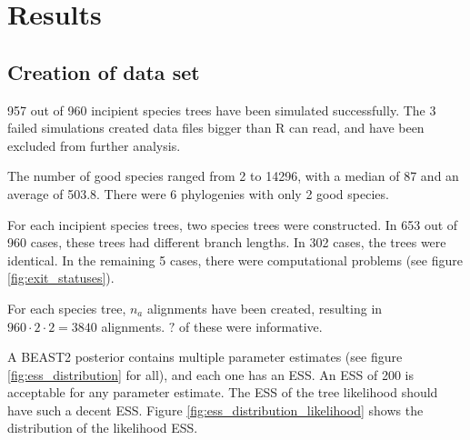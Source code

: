 \section{Results}

\subsection{Creation of data set}





957 out of 960 incipient species trees have been simulated successfully. 
The 3 failed simulations created data files bigger than R can read, 
and have been excluded from further analysis. 

The number of good species ranged from 2 to 14296, with a median of 87 and an average of 503.8. 
There were 6 phylogenies with only 2 good species.  



For each incipient species trees, two species trees were constructed. 
In 653 out of 960 cases, these trees had different branch lengths.
In 302 cases, the trees were identical. In the remaining 5 cases,
there were computational problems (see figure \ref{fig:exit_statuses}).



For each species tree, $n_a$ alignments have been created, 
resulting in $960 \cdot 2 \cdot 2 = 3840$ alignments. 
$?$ of these were informative.



A BEAST2 posterior contains multiple parameter estimates (see figure \ref{fig:ess_distribution} for all),
and each one has an ESS. An ESS of 200 is acceptable for any parameter estimate.
The ESS of the tree likelihood should have such a decent ESS. Figure \ref{fig:ess_distribution_likelihood}
shows the distribution of the likelihood ESS.

